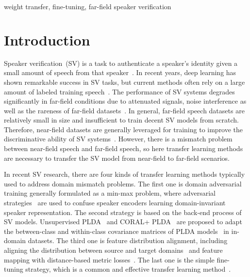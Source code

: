 \documentclass{article}
\begin{document}
%
\begin{keywords}
weight transfer, fine-tuning, far-field speaker verification
\end{keywords}
%
\section{Introduction}
\label{sec:intro}
Speaker verification~(SV) is a task to authenticate a speaker's identity given a small amount of speech from that speaker~\cite{naika2018overview}. In recent years, deep learning has shown remarkable success in SV tasks, but current methods often rely on a large amount of labeled training speech~\cite{nagrani2017voxceleb,desplanques2020ecapa}. The performance of SV systems degrades significantly in far-field conditions due to attenuated signals, noise interference as well as the rareness of far-field datasets~\cite{qin2020hi,movsner2022multisv}. In general, far-field speech datasets are relatively small in size and insufficient to train decent SV models from scratch. Therefore, near-field datasets are generally leveraged for training to improve the discriminative ability of SV systems~\cite{gusev2020stc,zhang2020npu}. However, there is a mismatch problem between near-field speech and far-field speech, so here transfer learning methods are necessary to transfer the SV model from near-field to far-field scenarios.

In recent SV research, there are four kinds of transfer learning methods typically used to address domain mismatch problems. %
The first one is domain adversarial training generally formulated as a min-max problem, where adversarial strategies~\cite{wang2018unsupervised,rohdin2019speaker} are used to confuse speaker encoders learning domain-invariant speaker representation. The second strategy is based on the back-end process of SV models. Unsupervised PLDA~\cite{garcia2014unsupervised} and CORAL+ PLDA~\cite{lee2019coral+} are proposed to adapt the between-class and within-class covariance matrices of PLDA models~\cite{prince2007probabilistic} in in-domain datasets. The third one is feature distribution alignment, including aligning the distribution between source and target domains~\cite{lin2020multi} and feature mapping with distance-based metric losses~\cite{movsner2019improving}. The last one is the simple fine-tuning strategy, which is a common and effective transfer learning method~\cite{gusev2020stc,zhang2020npu}.
\end{document}
